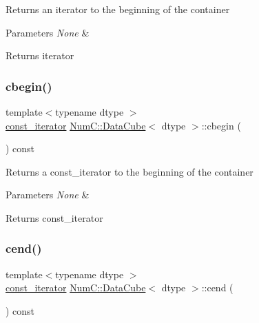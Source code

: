 Returns an iterator to the beginning of the container


\begin{DoxyParams}{Parameters}
{\em None} & \\
\hline
\end{DoxyParams}
\begin{DoxyReturn}{Returns}
iterator 
\end{DoxyReturn}
\mbox{\label{class_num_c_1_1_data_cube_a28a7d41b1be694f97b1af279b5afffad}} 
\subsubsection{\texorpdfstring{cbegin()}{cbegin()}}
{\footnotesize\ttfamily template$<$typename dtype $>$ \\
\mbox{\hyperlink{class_num_c_1_1_data_cube_afb6045a628e0587b3343da1dda12fa03}{const\+\_\+iterator}} \mbox{\hyperlink{class_num_c_1_1_data_cube}{Num\+C\+::\+Data\+Cube}}$<$ dtype $>$\+::cbegin (\begin{DoxyParamCaption}{ }\end{DoxyParamCaption}) const\hspace{0.3cm}{\ttfamily [inline]}}

Returns a const\+\_\+iterator to the beginning of the container


\begin{DoxyParams}{Parameters}
{\em None} & \\
\hline
\end{DoxyParams}
\begin{DoxyReturn}{Returns}
const\+\_\+iterator 
\end{DoxyReturn}
\mbox{\label{class_num_c_1_1_data_cube_ab218b7c28cb8329292167021c5ca75a0}} 
\subsubsection{\texorpdfstring{cend()}{cend()}}
{\footnotesize\ttfamily template$<$typename dtype $>$ \\
\mbox{\hyperlink{class_num_c_1_1_data_cube_afb6045a628e0587b3343da1dda12fa03}{const\+\_\+iterator}} \mbox{\hyperlink{class_num_c_1_1_data_cube}{Num\+C\+::\+Data\+Cube}}$<$ dtype $>$\+::cend (\begin{DoxyParamCaption}{ }\end{DoxyParamCaption}) const\hspace{0.3cm}{\ttfamily [inline]}}

